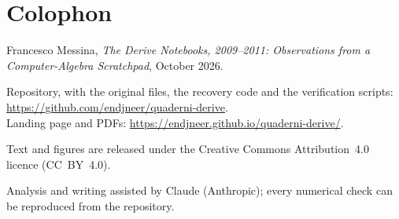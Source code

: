 \section*{Colophon}

\begin{small}
\noindent Francesco Messina, \emph{The Derive Notebooks, 2009--2011:
Observations from a Computer-Algebra Scratchpad}, October 2026.

\smallskip\noindent
Repository, with the original files, the recovery code and the verification
scripts: \url{https://github.com/endjneer/quaderni-derive}.\\
Landing page and PDFs: \url{https://endjneer.github.io/quaderni-derive/}.

\smallskip\noindent
Text and figures are released under the Creative Commons Attribution~4.0
licence (CC~BY~4.0).

\smallskip\noindent
Analysis and writing assisted by Claude (Anthropic); every numerical check can be reproduced from the repository.
\end{small}
